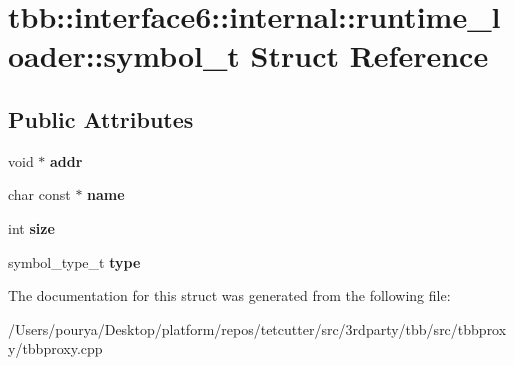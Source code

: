 \hypertarget{structtbb_1_1interface6_1_1internal_1_1runtime__loader_1_1symbol__t}{}\section{tbb\+:\+:interface6\+:\+:internal\+:\+:runtime\+\_\+loader\+:\+:symbol\+\_\+t Struct Reference}
\label{structtbb_1_1interface6_1_1internal_1_1runtime__loader_1_1symbol__t}
\subsection*{Public Attributes}
\begin{DoxyCompactItemize}
\item 
\hypertarget{structtbb_1_1interface6_1_1internal_1_1runtime__loader_1_1symbol__t_a5c1dbb09239c9cb96438173c7ce8d576}{}void $\ast$ {\bfseries addr}\label{structtbb_1_1interface6_1_1internal_1_1runtime__loader_1_1symbol__t_a5c1dbb09239c9cb96438173c7ce8d576}

\item 
\hypertarget{structtbb_1_1interface6_1_1internal_1_1runtime__loader_1_1symbol__t_a95ae0817082864d4af6cdd2ba72b3a39}{}char const $\ast$ {\bfseries name}\label{structtbb_1_1interface6_1_1internal_1_1runtime__loader_1_1symbol__t_a95ae0817082864d4af6cdd2ba72b3a39}

\item 
\hypertarget{structtbb_1_1interface6_1_1internal_1_1runtime__loader_1_1symbol__t_ac024545352cc8028a9e230cc27fe6701}{}int {\bfseries size}\label{structtbb_1_1interface6_1_1internal_1_1runtime__loader_1_1symbol__t_ac024545352cc8028a9e230cc27fe6701}

\item 
\hypertarget{structtbb_1_1interface6_1_1internal_1_1runtime__loader_1_1symbol__t_a90274b2f5de6168bbeba4dc3f4f20029}{}symbol\+\_\+type\+\_\+t {\bfseries type}\label{structtbb_1_1interface6_1_1internal_1_1runtime__loader_1_1symbol__t_a90274b2f5de6168bbeba4dc3f4f20029}

\end{DoxyCompactItemize}


The documentation for this struct was generated from the following file\+:\begin{DoxyCompactItemize}
\item 
/\+Users/pourya/\+Desktop/platform/repos/tetcutter/src/3rdparty/tbb/src/tbbproxy/tbbproxy.\+cpp\end{DoxyCompactItemize}
